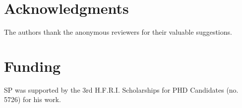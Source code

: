 \section{Acknowledgments}
The authors thank the anonymous reviewers for their valuable suggestions.

\section{Funding}
SP was supported by the 3rd H.F.R.I. Scholarships for PHD Candidates (no. 5726) for his work.
